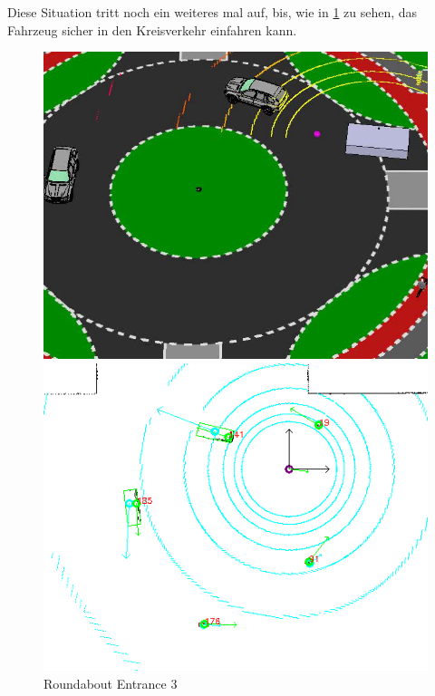 \documentclass[11pt,oneside,openright]{mpreport}
\begin{document}
Diese Situation tritt noch ein weiteres mal auf, bis, wie in \cref{roundabout_entrance_3} zu sehen, das Fahrzeug sicher in den Kreisverkehr einfahren kann.

\begin{figure}[htb]
  \caption{Roundabout Entrance 3} 
    \centering
    \begin{minipage}[t]{0.49\textwidth}
        \centering
          \includegraphics[width=\textwidth]{bilder/sim05.png}
    \end{minipage}%
    \hfill
    \begin{minipage}[t]{0.49\textwidth}
        \centering
	\includegraphics[width=\textwidth]{bilder/sim06.png}
    \end{minipage}
    \label{roundabout_entrance_3}
\end{figure}
\end{document}
